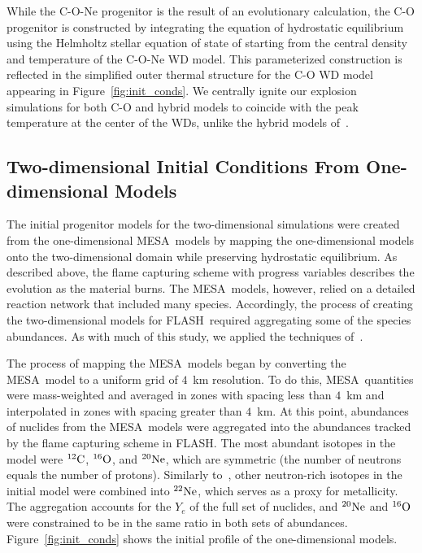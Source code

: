 \documentclass[preprint2]{aastex63}
\newcommand{\figref}[1]{Figure~\ref{#1}}
\newcommand{\C}[1]{\ensuremath{{}^{#1}{\rm C}}}
\newcommand{\Ox}[1]{\ensuremath{{}^{#1}{\rm O}}}
\newcommand{\Ne}[1]{\ensuremath{{}^{#1}{\rm Ne}}}
\newcommand{\code}[1]{\textsc{#1}}
\newcommand{\FLASH}{\code{FLASH}}
\newcommand{\MESA}{\code{MESA}}
\begin{document}
{\color{blue} While the C-O-Ne progenitor is the result of an evolutionary calculation,
the C-O progenitor is constructed by integrating the equation of hydrostatic equilibrium
using the Helmholtz stellar equation of state of \citet{timmes.swesty:accuracy} starting
from the central density and temperature of the C-O-Ne WD model.
This parameterized construction is reflected in the simplified
outer thermal structure for the C-O WD model appearing in Figure~\ref{fig:init_conds}.}
We centrally ignite our explosion simulations for both C-O and hybrid
models to coincide with the peak temperature at the center of the WDs,
unlike the hybrid models of~\citet{willcoxetal2016}.


\subsection{Two-dimensional Initial Conditions From One-dimensional Models}

The initial progenitor models for the two-dimensional simulations were
created from the one-dimensional \MESA\ models by mapping the one-dimensional
models onto the two-dimensional domain while
preserving hydrostatic equilibrium.
As described above, the flame capturing scheme with progress
variables describes the evolution as the material burns. The \MESA\
models, however, relied on a detailed reaction network that included
many species. Accordingly, the process of creating the two-dimensional
models for \FLASH\ required aggregating some of the species abundances.
As with much of this study, we applied the
techniques of~\citet{willcoxetal2016}.


The process of mapping the \MESA\ models began by converting
the \MESA\ model to a uniform grid of $4$~km resolution.
To do this, \MESA\ quantities were mass-weighted and averaged in zones with spacing less than $4$~km
and interpolated in zones with spacing greater than $4$~km.
At this point,
abundances of nuclides from the \MESA\ models were aggregated
into the abundances tracked by the flame capturing scheme in
\FLASH.
The most abundant isotopes in the model were \C{12}, \Ox{16},
and \Ne{20}, which are symmetric (the number of neutrons
equals the number of protons). Similarly to~\citet{willcoxetal2016},
other neutron-rich isotopes in the initial model were combined into
\Ne{22}, which serves as a proxy for metallicity. The aggregation
accounts for the $Y_e$ of the full set of nuclides, and \Ne{20}
and \Ox{16} were constrained to be in the same ratio in both
sets of abundances. \figref{fig:init_conds} shows the initial
profile of the one-dimensional models.
\end{document}
